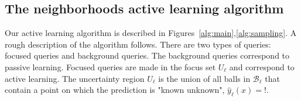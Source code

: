 \documentclass{article}
\def\B{{\mathcal B}}
\def\yh{{\widehat{y}}}
\begin{document}
\subsection{The neighborhoods active learning algorithm}

Our active learning algorithm is described in
Figures~\ref{alg:main},\ref{alg:sampling}.  A rough description of the
algorithm follows. There are two types of queries: focused queries and
background queries. The background queries correspond to passive
learning. Focused queries are made in the focus set $U_\ell$ and
correspond to active learning. The uncertainty region $U_\ell$ is the
union of all balls in $\B_{\ell}$ that contain a point on which the
prediction is "known unknown", $\yh_\ell(x)=!$.


\end{document}

